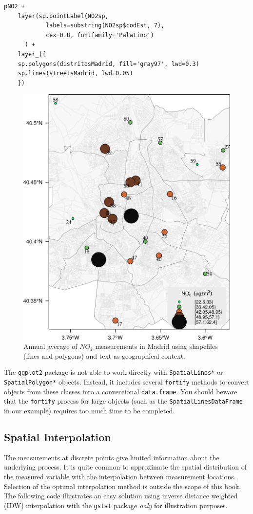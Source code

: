 \documentclass[smallroyalvopaper]{memoir}
\begin{document}
\lstset{language=R,numbers=none}
\begin{lstlisting}
pNO2 +
    layer(sp.pointLabel(NO2sp,
			labels=substring(NO2sp$codEst, 7),
			cex=0.8, fontfamily='Palatino')
	  ) +
    layer_({
	sp.polygons(distritosMadrid, fill='gray97', lwd=0.3)
	sp.lines(streetsMadrid, lwd=0.05)
    })
\end{lstlisting}

\begin{figure}[htb]
\centering
\includegraphics[width=.9\linewidth]{figs/airMadrid.png}
\caption{\label{fig:airMadrid}Annual average of $NO_2$ measurements in Madrid using shapefiles (lines and polygons) and text as geographical context.}
\end{figure}

The \texttt{ggplot2} package is not able to work directly with
\texttt{SpatialLines*} or \texttt{SpatialPolygon*} objects. Instead, it includes
several \texttt{fortify} methods to convert objects from these classes into a
conventional \texttt{data.frame}. You should beware that the \texttt{fortify}
process for large objects (such as the \texttt{SpatialLinesDataFrame} in our
example) requires too much time to be completed.

\subsection{Spatial Interpolation}
\label{sec-1-5}
The measurements at discrete points give limited information about the
underlying process. It is quite common to approximate the spatial
distribution of the measured variable with the interpolation between
measurement locations. Selection of the optimal interpolation method
is outside the scope of this book. The following code illustrates an
easy solution using inverse distance weighted (IDW) interpolation with
the \texttt{gstat} package \cite{Pebesma2004} \emph{only} for illustration
purposes.
\end{document}
